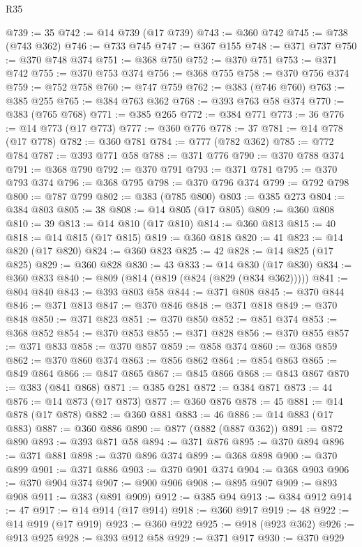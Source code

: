 \begin{lexlean}{R35}
\begin{coremodule}
@739 := 35
@742 := @14 @739 (@17 @739)
@743 := @360 @742
@745 := @738 (@743 @362)
@746 := @733 @745
@747 := @367 @155
@748 := @371 @737
@750 := @370 @748 @374
@751 := @368 @750
@752 := @370 @751
@753 := @371 @742
@755 := @370 @753 @374
@756 := @368 @755
@758 := @370 @756 @374
@759 := @752 @758
@760 := @747 @759
@762 := @383 (@746 @760)
@763 := @385 @255
@765 := @384 @763 @362
@768 := @393 @763 @58 @374
@770 := @383 (@765 @768)
@771 := @385 @265
@772 := @384 @771
@773 := 36
@776 := @14 @773 (@17 @773)
@777 := @360 @776
@778 := 37
@781 := @14 @778 (@17 @778)
@782 := @360 @781
@784 := @777 (@782 @362)
@785 := @772 @784
@787 := @393 @771 @58
@788 := @371 @776
@790 := @370 @788 @374
@791 := @368 @790
@792 := @370 @791
@793 := @371 @781
@795 := @370 @793 @374
@796 := @368 @795
@798 := @370 @796 @374
@799 := @792 @798
@800 := @787 @799
@802 := @383 (@785 @800)
@803 := @385 @273
@804 := @384 @803
@805 := 38
@808 := @14 @805 (@17 @805)
@809 := @360 @808
@810 := 39
@813 := @14 @810 (@17 @810)
@814 := @360 @813
@815 := 40
@818 := @14 @815 (@17 @815)
@819 := @360 @818
@820 := 41
@823 := @14 @820 (@17 @820)
@824 := @360 @823
@825 := 42
@828 := @14 @825 (@17 @825)
@829 := @360 @828
@830 := 43
@833 := @14 @830 (@17 @830)
@834 := @360 @833
@840 := @809 (@814 (@819 (@824 (@829 (@834 @362)))))
@841 := @804 @840
@843 := @393 @803 @58
@844 := @371 @808
@845 := @370 @844
@846 := @371 @813
@847 := @370 @846
@848 := @371 @818
@849 := @370 @848
@850 := @371 @823
@851 := @370 @850
@852 := @851 @374
@853 := @368 @852
@854 := @370 @853
@855 := @371 @828
@856 := @370 @855
@857 := @371 @833
@858 := @370 @857
@859 := @858 @374
@860 := @368 @859
@862 := @370 @860 @374
@863 := @856 @862
@864 := @854 @863
@865 := @849 @864
@866 := @847 @865
@867 := @845 @866
@868 := @843 @867
@870 := @383 (@841 @868)
@871 := @385 @281
@872 := @384 @871
@873 := 44
@876 := @14 @873 (@17 @873)
@877 := @360 @876
@878 := 45
@881 := @14 @878 (@17 @878)
@882 := @360 @881
@883 := 46
@886 := @14 @883 (@17 @883)
@887 := @360 @886
@890 := @877 (@882 (@887 @362))
@891 := @872 @890
@893 := @393 @871 @58
@894 := @371 @876
@895 := @370 @894
@896 := @371 @881
@898 := @370 @896 @374
@899 := @368 @898
@900 := @370 @899
@901 := @371 @886
@903 := @370 @901 @374
@904 := @368 @903
@906 := @370 @904 @374
@907 := @900 @906
@908 := @895 @907
@909 := @893 @908
@911 := @383 (@891 @909)
@912 := @385 @94
@913 := @384 @912
@914 := 47
@917 := @14 @914 (@17 @914)
@918 := @360 @917
@919 := 48
@922 := @14 @919 (@17 @919)
@923 := @360 @922
@925 := @918 (@923 @362)
@926 := @913 @925
@928 := @393 @912 @58
@929 := @371 @917
@930 := @370 @929

\end{coremodule}
\end{lexlean}
